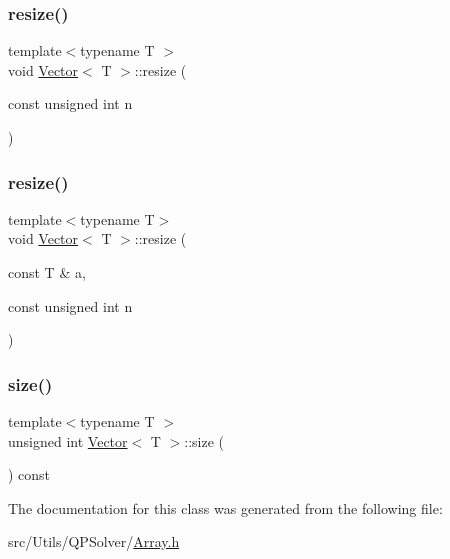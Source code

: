 \mbox{\label{classVector_ae751d4bf4c403e4578a9df1202e93f56}} 
\subsubsection{\texorpdfstring{resize()}{resize()}\hspace{0.1cm}{\footnotesize\ttfamily [1/2]}}
{\footnotesize\ttfamily template$<$typename T $>$ \\
void \mbox{\hyperlink{classVector}{Vector}}$<$ T $>$\+::resize (\begin{DoxyParamCaption}\item[{const unsigned int}]{n }\end{DoxyParamCaption})\hspace{0.3cm}{\ttfamily [inline]}}

\mbox{\label{classVector_a1ff5ed0bca47854450eb78024c6f52ff}} 
\subsubsection{\texorpdfstring{resize()}{resize()}\hspace{0.1cm}{\footnotesize\ttfamily [2/2]}}
{\footnotesize\ttfamily template$<$typename T$>$ \\
void \mbox{\hyperlink{classVector}{Vector}}$<$ T $>$\+::resize (\begin{DoxyParamCaption}\item[{const T \&}]{a,  }\item[{const unsigned int}]{n }\end{DoxyParamCaption})\hspace{0.3cm}{\ttfamily [inline]}}

\mbox{\label{classVector_a5214a382564aedc712b609416aa3b7b1}} 
\subsubsection{\texorpdfstring{size()}{size()}}
{\footnotesize\ttfamily template$<$typename T $>$ \\
unsigned int \mbox{\hyperlink{classVector}{Vector}}$<$ T $>$\+::size (\begin{DoxyParamCaption}{ }\end{DoxyParamCaption}) const\hspace{0.3cm}{\ttfamily [inline]}}



The documentation for this class was generated from the following file\+:\begin{DoxyCompactItemize}
\item 
src/\+Utils/\+Q\+P\+Solver/\mbox{\hyperlink{Array_8h}{Array.\+h}}\end{DoxyCompactItemize}
